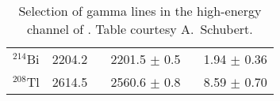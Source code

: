 \begin{table}
\begin{tabular}{  c  r  r  c  }
					$^{214}$Bi     & 2204.2    ~ & 2201.5     ${\pm}$ 0.5       ~ & 1.94       ${\pm}$ 0.36       \\
					$^{208}$Tl    & 2614.5    ~ & 2560.6     ${\pm}$ 0.8       ~ & 8.59       ${\pm}$ 0.70       \\
					\bottomrule
					\end{tabular}

				
					\caption[Selection of gamma lines in the high-energy channel of .]
					{Selection of gamma lines in the high-energy channel of .  Table courtesy A.~Schubert.}
					\label{tab:PPC2HighEnergyGammaLines}
				\end{table}
	
